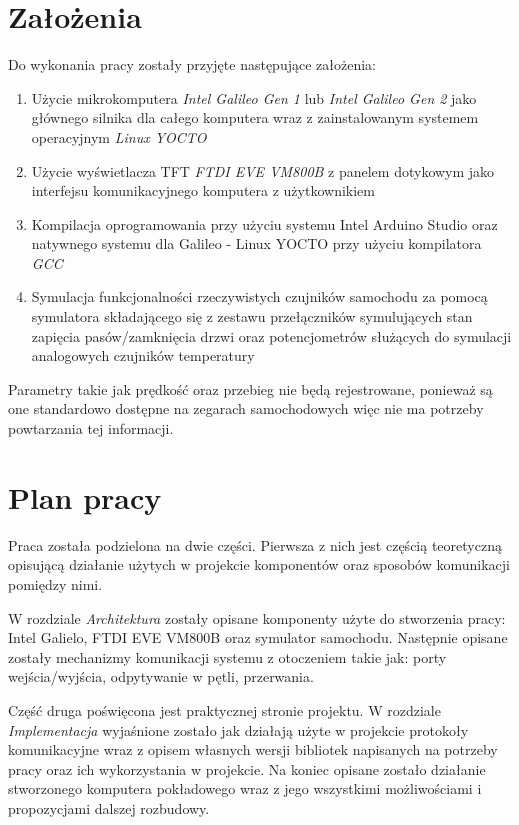 \documentclass{xmgr}
\begin{document}
\section{Założenia}
Do wykonania pracy zostały przyjęte następujące założenia:
\begin{enumerate}
	\item Użycie mikrokomputera \emph{Intel Galileo Gen 1} lub \emph{Intel Galileo Gen 2} jako głównego silnika dla całego komputera wraz z zainstalowanym systemem operacyjnym \emph{Linux YOCTO}
	\item Użycie wyświetlacza TFT \emph{FTDI EVE VM800B} z panelem dotykowym jako interfejsu komunikacyjnego komputera z użytkownikiem 
	\item Kompilacja oprogramowania przy użyciu systemu Intel Arduino Studio oraz natywnego systemu dla Galileo - Linux YOCTO przy użyciu kompilatora \emph{GCC}
	\item Symulacja funkcjonalności rzeczywistych czujników samochodu za pomocą symulatora składającego się z zestawu przełączników symulujących stan zapięcia pasów/zamknięcia drzwi oraz potencjometrów służących do symulacji analogowych czujników temperatury
\end{enumerate}

Parametry takie jak prędkość oraz przebieg nie będą rejestrowane, ponieważ są one standardowo dostępne na zegarach samochodowych więc nie ma potrzeby powtarzania tej informacji.

\section{Plan pracy}
Praca została podzielona na dwie części. Pierwsza z nich jest częścią teoretyczną opisującą działanie użytych w projekcie komponentów oraz sposobów komunikacji pomiędzy nimi. 

W rozdziale \emph{Architektura} zostały opisane komponenty użyte do stworzenia pracy: Intel Galielo, FTDI EVE VM800B oraz symulator samochodu. Następnie opisane zostały mechanizmy komunikacji systemu z otoczeniem takie jak: porty wejścia/wyjścia, odpytywanie w pętli, przerwania.

Część druga poświęcona jest praktycznej stronie projektu. W rozdziale \emph{Implementacja} wyjaśnione zostało jak działają użyte w projekcie protokoły komunikacyjne wraz z opisem własnych wersji bibliotek napisanych na potrzeby pracy oraz ich wykorzystania w projekcie. Na koniec opisane zostało działanie stworzonego komputera pokładowego wraz z jego wszystkimi możliwościami i propozycjami dalszej rozbudowy.
\end{document}
